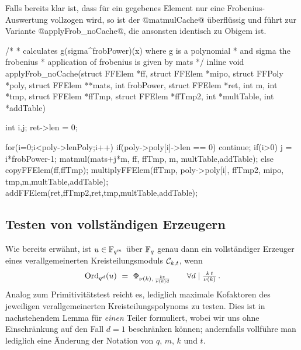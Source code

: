 Falls bereits klar ist, dass für ein gegebenes Element nur eine
Frobenius-Auswertung vollzogen wird, so ist der @matmulCache@ überflüssig und
führt zur Variante @applyFrob_noCache@, die ansonsten identisch zu Obigem ist.

\begin{ccode}[caption={[\texttt{void applyFrob\_noCache} aus 
 \url{../Sage/enumeratePCNs.c}]Aus \url{../Sage/enumeratePCNs.c}},
  label=lst:applyFrob_noCache]
/*
 * calculates g(sigma^frobPower)(x) where g is a polynomial 
 * and sigma the frobenius
 * application of frobenius is given by mats
 */
inline void applyFrob_noCache(struct FFElem *ff, struct FFElem *mipo,
        struct FFPoly *poly,
        struct FFElem **mats,
        int frobPower, struct FFElem *ret, 
        int m, int *tmp, struct FFElem *ffTmp, struct FFElem *ffTmp2,
        int *multTable, int *addTable){
    int i,j;
    ret->len = 0;
    
    for(i=0;i<poly->lenPoly;i++){
        if(poly->poly[i]->len == 0) continue;
        if(i>0){
            j = i*frobPower-1;
            matmul(mats+j*m, ff, ffTmp, m, multTable,addTable);
        }else{
            copyFFElem(ff,ffTmp);
        }
        multiplyFFElem(ffTmp, poly->poly[i],
                ffTmp2, mipo,
                tmp,m,multTable,addTable);
        addFFElem(ret,ffTmp2,ret,tmp,multTable,addTable);
    }
}
\end{ccode}


\subsection{Testen von vollständigen Erzeugern}

Wie bereits erwähnt, ist $u\in \mathbb{F}_{q^m}$ über $\mathbb{F}_q$ genau dann ein vollständiger
Erzeuger eines verallgemeinerten Kreisteilungsmoduls $\mathcal{C}_{k,t}$, wenn
\[ \operatorname{Ord}_{q^d}(u) \ =\  \Phi_{\nu(k),\, \frac{kt}{\nu(k)d}} \qquad
  \forall d\mid \tfrac{k\,t}{\nu(k)}\,.\]
Analog zum Primitivitätstest reicht es, lediglich maximale Kofaktoren des
jeweiligen verallgemeinerten Kreisteilungspolynoms zu testen. 
Dies ist in nachstehendem Lemma für \emph{einen} Teiler
formuliert, wobei wir uns ohne Einschränkung
auf den Fall $d=1$ beschränken können; andernfalls vollführe man lediglich eine
Änderung der Notation von $q$, $m$, $k$ und $t$.

